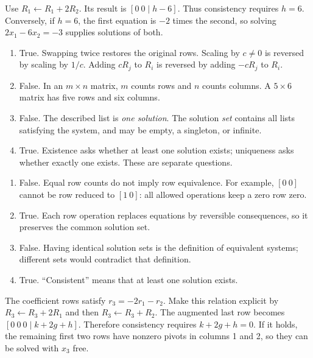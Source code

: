 Use $R_1\leftarrow R_1+2R_2$. Its result is
$[0\ 0\mid h-6]$. Thus consistency requires $h=6$.
Conversely, if $h=6$, the first equation is $-2$ times the second,
so solving $2x_1-6x_2=-3$ supplies solutions of both.

\begin{enumerate}[label=(\alph*)]
\item True. Swapping twice restores the original rows. Scaling by $c\ne0$
is reversed by scaling by $1/c$. Adding $cR_j$ to $R_i$ is reversed by
adding $-cR_j$ to $R_i$.
\item False. In an $m\times n$ matrix, $m$ counts rows and $n$ counts
columns. A $5\times6$ matrix has five rows and six columns.
\item False. The described list is \emph{one solution}. The solution
\emph{set} contains all lists satisfying the system, and may be empty,
a singleton, or infinite.
\item True. Existence asks whether at least one solution exists;
uniqueness asks whether exactly one exists. These are separate questions.
\end{enumerate}

\begin{enumerate}[label=(\alph*)]
\item False. Equal row counts do not imply row equivalence. For example,
$[0\ 0]$ cannot be row reduced to $[1\ 0]$: all allowed operations
keep a zero row zero.
\item True. Each row operation replaces equations by reversible
consequences, so it preserves the common solution set.
\item False. Having identical solution sets is the definition of equivalent
systems; different sets would contradict that definition.
\item True. ``Consistent'' means that at least one solution exists.
\end{enumerate}

The coefficient rows satisfy $r_3=-2r_1-r_2$.
Make this relation explicit by $R_3\leftarrow R_3+2R_1$ and then
$R_3\leftarrow R_3+R_2$. The augmented last row becomes
$[0\ 0\ 0\mid k+2g+h]$. Therefore consistency requires
$k+2g+h=0$. If it holds, the remaining first two rows have nonzero
pivots in columns 1 and 2, so they can be solved with $x_3$ free.

